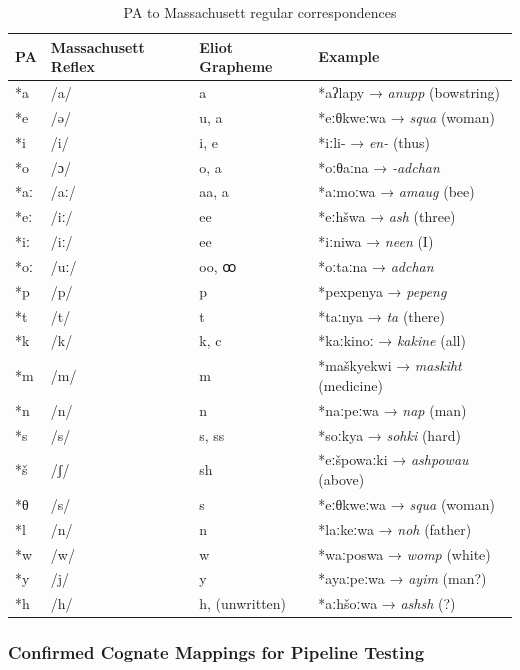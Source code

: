 \begin{table}[h]
\centering
\begin{tabular}{llll}
\toprule
PA & Massachusett Reflex & Eliot Grapheme & Example \\
\midrule
*a & /a/ & a & *aʔlapy → \textit{anupp} (bowstring) \\
*e & /ə/ & u, a & *eːθkweːwa → \textit{squa} (woman) \\
*i & /i/ & i, e & *iːli- → \textit{en-} (thus) \\
*o & /ɔ/ & o, a & *oːθaːna → \textit{-adchan} \\
*aː & /aː/ & aa, a & *aːmoːwa → \textit{amaug} (bee) \\
*eː & /iː/ & ee & *eːhšwa → \textit{ash} (three) \\
*iː & /iː/ & ee & *iːniwa → \textit{neen} (I) \\
*oː & /uː/ & oo, ꝏ & *oːtaːna → \textit{adchan} \\
*p & /p/ & p & *pexpenya → \textit{pepeng} \\
*t & /t/ & t & *taːnya → \textit{ta} (there) \\
*k & /k/ & k, c & *kaːkinoː → \textit{kakine} (all) \\
*m & /m/ & m & *maškyekwi → \textit{maskiht} (medicine) \\
*n & /n/ & n & *naːpeːwa → \textit{nap} (man) \\
*s & /s/ & s, ss & *soːkya → \textit{sohki} (hard) \\
*š & /ʃ/ & sh & *eːšpowaːki → \textit{ashpowau} (above) \\
*θ & /s/ & s & *eːθkweːwa → \textit{squa} (woman) \\
*l & /n/ & n & *laːkeːwa → \textit{noh} (father) \\
*w & /w/ & w & *waːposwa → \textit{womp} (white) \\
*y & /j/ & y & *ayaːpeːwa → \textit{ayim} (man?) \\
*h & /h/ & h, (unwritten) & *aːhšoːwa → \textit{ashsh} (?) \\
\bottomrule
\end{tabular}
\caption{PA to Massachusett regular correspondences}
\label{tab:1363-pa}
\end{table}

\subsubsection{Confirmed Cognate Mappings for Pipeline Testing}

